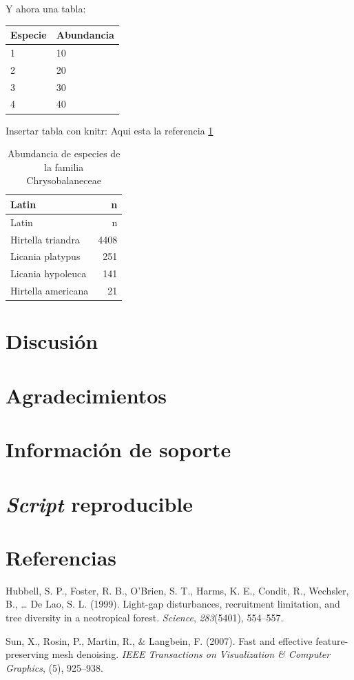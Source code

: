 \documentclass[11pt,]{article}
\begin{document}
Y ahora una tabla:

\begin{longtable}[]{@{}ll@{}}
\toprule
Especie & Abundancia\tabularnewline
\midrule
\endhead
1 & 10\tabularnewline
2 & 20\tabularnewline
3 & 30\tabularnewline
4 & 40\tabularnewline
\bottomrule
\end{longtable}

Insertar tabla con knitr: Aqui esta la referencia \ref{tab:tababun}

\begin{longtable}[]{@{}lr@{}}
\caption{\label{tab:tababun}Abundancia de especies de la familia
Chrysobalaneceae}\tabularnewline
\toprule
Latin & n\tabularnewline
\midrule
\endfirsthead
\toprule
Latin & n\tabularnewline
\midrule
\endhead
Hirtella triandra & 4408\tabularnewline
Licania platypus & 251\tabularnewline
Licania hypoleuca & 141\tabularnewline
Hirtella americana & 21\tabularnewline
\bottomrule
\end{longtable}

\section{Discusión}\label{discusiuxf3n}

\section{Agradecimientos}\label{agradecimientos}

\section{Información de soporte}\label{informaciuxf3n-de-soporte}

\section{\texorpdfstring{\emph{Script}
reproducible}{Script reproducible}}\label{script-reproducible}

\section*{Referencias}\label{referencias}

\hypertarget{refs}{}
\hypertarget{ref-hubbell1999light}{}
Hubbell, S. P., Foster, R. B., O'Brien, S. T., Harms, K. E., Condit, R.,
Wechsler, B., \ldots{} De Lao, S. L. (1999). Light-gap disturbances,
recruitment limitation, and tree diversity in a neotropical forest.
\emph{Science}, \emph{283}(5401), 554--557.

\hypertarget{ref-sun2007fast}{}
Sun, X., Rosin, P., Martin, R., \& Langbein, F. (2007). Fast and
effective feature-preserving mesh denoising. \emph{IEEE Transactions on
Visualization \& Computer Graphics}, (5), 925--938.




\newpage
\singlespacing 
\end{document}
